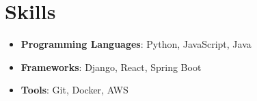 \documentclass[10pt, a4paper]{article}
\begin{document}
\section{Skills}
\begin{itemize}[leftmargin=*,noitemsep,nolistsep]
    
        \item \textbf{Programming Languages}: Python, JavaScript, Java
    
        \item \textbf{Frameworks}: Django, React, Spring Boot
    
        \item \textbf{Tools}: Git, Docker, AWS
    
\end{itemize}
\end{document}
